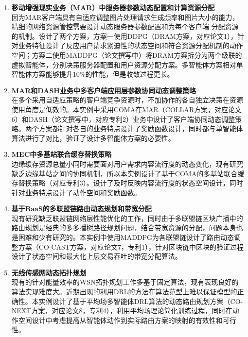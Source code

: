\documentclass{resume}
\begin{document}
\begin{enumerate}
  \item \textbf{移动增强现实业务（MAR）中服务器参数动态配置和计算资源分配}
  \\ 因为MAR客户端具有自适应调整图片处理请求生成频率和图片大小的能力，精细的网络资源管控需要设计动态服务器参数配置和为每个客户端 分配资源的机制。设计了两个方案，方案一使用DDPG（DRAM方案，对应论文1），针对业务特征设计了反应用户请求紧迫性的状态空间和符合资源分配机制的动作空间；方案二使用MADDPG（论文撰写中）将DRAM方案拆分为两个级联的虚拟智能体，分别决策服务器配置和用户资源分配方案。多智能体方案相对单智能体方案能够提升10\%的性能，但是收敛过程更长。
  \item \textbf{MAR和DASH业务中多客户端应用层参数协同动态调整策略} 
  \\ 在多个采用自适应策略的客户端竞争资源时，不加协作的各自独立决策在资源使用角度是低效的。本实例中采用COMA在MAR（COLLAR方案，对应论文6）和DASH（论文撰写中，对应专利2）业务中设计了客户端协同动态调整策略。两个方案都针对各自的业务特点设计了奖励函数设计，同时都与单智能体算法进行了对比，验证了设计多智能体方案的必要性。
  \item \textbf{MEC中多基站联合缓存替换策略} 
  \\ 边缘缓存资源总量小同时需要面对用户需求内容流行度的动态变化，现有研究缺乏边缘基站之间的协同机制，所以本实例设计了基于COMA的多基站联合缓存替换策略（对应专利3）。设计了及时反映内容流行度的状态空间设计，同时针对业务特点设计了动作空间和奖励函数。
  \item  \textbf{基于BaaS的多联盟链路由动态规划和带宽分配}
  \\ 现有研究缺乏联盟链网络层性能优化的工作，同时由于多联盟链区块广播中的路由规划是经典的多多播树路径规划问题，结合带宽资源的分配，问题本身也是困难和少有研究的。本实例中使用MADDPG为各联盟链设计了路由动态调整方案（CO-CAST方案，对应论文7，专利1），针对区块链中区块的验证过程设计了状态空间和最大化上层交易吞吐的带宽分配算法。
  \item \textbf{无线传感网动态拓扑规划}
  \\ 现有的针对能量效率的WSN拓扑规划工作多基于固定算法，现有表现良好的算法实现难度大。近期出现的利用DRL的方法在算法范型上难以保证模型的正确性。本实例设计了基于平均场多智能体DRL算法的动态路由规划方案（CO-NEXT方案，对应论文8，专利4），利用平均场理论简化训练过程，同时在动作空间设计中考虑提高从智能体动作到实际路由方案的映射的有效性和可行性。
\end{enumerate}
\end{document}
